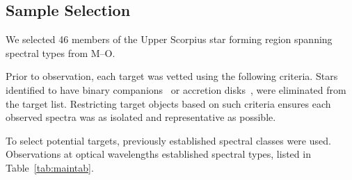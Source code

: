 \subsection{Sample Selection}\label{sec:sampsel}

\iffalse
	To better classify young stars ($\sim$11~Myr old), 
	the most essential restriction on this atlas was to 
	have each star be approximately the same age. 
	Star forming regions are ideal locations for such stars, 
	solidifying the choice of observing Upper Sco members.  
	Surveying the literature verified all targets as members of this 
	region.  In order to be build a comprehensive atlas of young 
	stars, various spectral types needed to be included 
	(from class M to class O).
\fi
We selected 46 members of the Upper Scorpius star forming region spanning spectral types from M--O.



Prior to observation, each target was vetted using the following criteria. 
Stars identified to have binary companions~\cite{binary_guy} or accretion 
disks~\cite{binary_guy}, were eliminated from the target list.  
Restricting target objects based on such criteria ensures each observed 
spectra was as isolated and representative as possible.



To select potential targets, previously established spectral classes 
were used.  
Observations at optical wavelengths established 
spectral types, listed in Table~\ref{tab:maintab}.  












